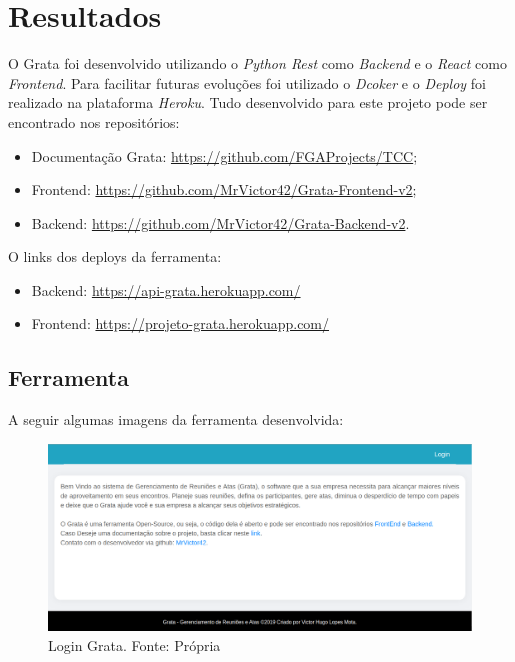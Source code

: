 \chapter[Resultados]{Resultados}
\label{cp:resultados}

O Grata foi desenvolvido utilizando o \textit{Python Rest} como \textit{Backend} e o \textit{React} como \textit{Frontend}. Para facilitar futuras evoluções foi utilizado o \textit{Dcoker} e o \textit{Deploy} foi realizado na plataforma \textit{Heroku}. Tudo desenvolvido para este projeto pode ser encontrado nos repositórios:
\begin{itemize}
    \item Documentação Grata: \url{https://github.com/FGAProjects/TCC};
    \item Frontend: \url{https://github.com/MrVictor42/Grata-Frontend-v2};
    \item Backend: \url{https://github.com/MrVictor42/Grata-Backend-v2}.
\end{itemize}

O links dos deploys da ferramenta:
\begin{itemize}
    \item Backend: \url{https://api-grata.herokuapp.com/}
    \item Frontend: \url{https://projeto-grata.herokuapp.com/}
\end{itemize}

\section{Ferramenta}

A seguir algumas imagens da ferramenta desenvolvida:

\begin{figure}[H]
    \centering
    \includegraphics[width=1.0\textwidth]{figuras/grata_login.png}
    \caption{Login Grata. Fonte: Própria}
    \label{img:grata_login}
\end{figure}

